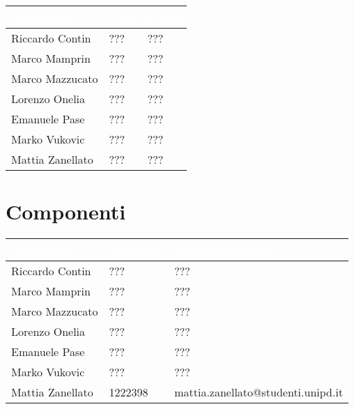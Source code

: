 \begin{table}[H]
  \centering
  \begin{tabular}{|C{3,5cm}C{2cm}C{6,5cm}|}
    \hline
    \textcolor[HTML]{FFFFFF}{\textbf{Nominativo}} & \textcolor[HTML]{FFFFFF}{\textbf{Data}} & \textcolor[HTML]{FFFFFF}{\textbf{Firma}} \\ \hline
    Riccardo Contin & ??? & ??? \\ \hline
    Marco Mamprin & ??? & ??? \\ \hline
    Marco Mazzucato & ??? & ??? \\ \hline
    Lorenzo Onelia & ??? & ??? \\ \hline
    Emanuele Pase & ??? & ??? \\ \hline
    Marko Vukovic & ??? & ??? \\ \hline
    Mattia Zanellato & ??? & ??? \\ \hline
  \end{tabular}
\end{table}


\section{Componenti}
\renewcommand\arraystretch{1,5}

\begin{table}[H]
  \centering
  \begin{tabular}{|C{3,5cm}C{2cm}C{6,5cm}|}
    \hline
    \textcolor[HTML]{FFFFFF}{\textbf{Nominativo}} & \textcolor[HTML]{FFFFFF}{\textbf{Matricola}} & \textcolor[HTML]{FFFFFF}{\textbf{Posta Elettronica}} \\ \hline
    Riccardo Contin & ??? & ??? \\ \hline
    Marco Mamprin & ??? & ??? \\ \hline
    Marco Mazzucato & ??? & ??? \\ \hline
    Lorenzo Onelia & ??? & ??? \\ \hline
    Emanuele Pase & ??? & ??? \\ \hline
    Marko Vukovic & ??? & ??? \\ \hline
    Mattia Zanellato & 1222398 & mattia.zanellato@studenti.unipd.it \\ \hline
  \end{tabular}
\end{table}

